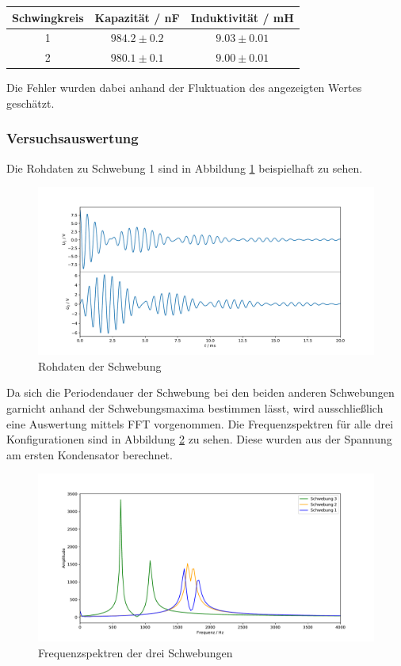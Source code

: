 \begin{table}[H]
\centering
\begin{tabular}{c|c|c}
Schwingkreis & Kapazität / nF & Induktivität / mH\\
\hline
1 & $984.2 \pm 0.2$ & $9.03 \pm 0.01$ \\
2 & $980.1 \pm 0.1$ & $9.00 \pm 0.01$
\end{tabular}
\end{table} 

Die Fehler wurden dabei anhand der Fluktuation des angezeigten Wertes geschätzt.

\subsubsection{Versuchsauswertung}

Die Rohdaten zu Schwebung 1 sind in Abbildung \ref{abb:schwebung_roh} beispielhaft zu sehen.

\begin{figure}[H]
\centering
\includegraphics[width=\textwidth]{plots/schwebung_roh.pdf}
\caption{Rohdaten der Schwebung}
\label{abb:schwebung_roh}
\end{figure}

Da sich die Periodendauer der Schwebung bei den beiden anderen Schwebungen garnicht anhand der Schwebungsmaxima bestimmen lässt, wird ausschließlich eine Auswertung mittels FFT vorgenommen. Die Frequenzspektren für alle drei Konfigurationen sind in Abbildung \ref{abb:FFT_schwebung} zu sehen. Diese wurden aus der Spannung am ersten Kondensator berechnet.

\begin{figure}
\centering
\includegraphics[width=\textwidth]{plots/FFT_schwebungen.pdf}
\caption{Frequenzspektren der drei Schwebungen}
\label{abb:FFT_schwebung}
\end{figure}

